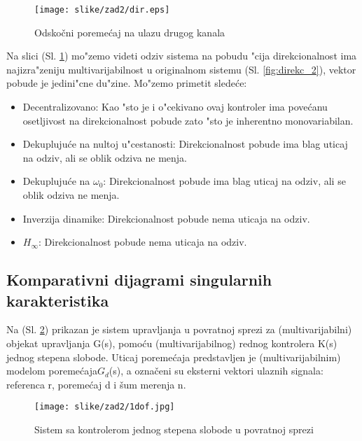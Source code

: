 \documentclass[a4paper,11pt]{article}
\theoremstyle{definition} \newtheorem{deff}{Definicija}[section]
\theoremstyle{definition} \newtheorem{prim}[deff]{Primer}
\theoremstyle{plain} \newtheorem{teor}[deff]{Teorema}
\begin{document}
			\begin{figure}[!ht]
				\centering
				\texttt{[image: slike/zad2/dir.eps]}
				\caption{Odskočni poremećaj na ulazu drugog kanala}
				\label{fig:dir}
			\end{figure}
			\vspace{1cm}
			Na slici (Sl. \ref{fig:dir}) mo"zemo videti odziv sistema na pobudu "cija direkcionalnost ima najizra"zeniju multivarijabilnost u originalnom sistemu (Sl. \ref{fig:direkc_2}), vektor pobude je jedini"cne du"zine. Mo"zemo primetit slede\'ce: 
			\begin{itemize}
				\item Decentralizovano: Kao "sto je i o"cekivano ovaj kontroler ima pove\'canu osetljivost na direkcionalnost pobude zato "sto je inherentno monovariabilan.
				
				\item Dekupluju\'ce na nultoj u"cestanosti: Direkcionalnost pobude ima blag uticaj na odziv, ali se oblik odziva ne menja.
				
				\item Dekupluju\'ce na $\omega_0$: Direkcionalnost pobude ima blag uticaj na odziv, ali se oblik odziva ne menja.
				
				\item Inverzija dinamike: Direkcionalnost pobude nema uticaja na odziv.
				
				\item $H_{\infty}$: Direkcionalnost pobude nema uticaja na odziv.
			\end{itemize}
			
			
			
			\clearpage
			
			
			\subsection{Komparativni dijagrami singularnih karakteristika}
			
			Na (Sl. \ref{fig:1dof}) prikazan je sistem upravljanja u povratnoj sprezi za (multivarijabilni) objekat upravljanja G(s), pomoću (multivarijabilnog) rednog kontrolera K(s) jednog stepena slobode. Uticaj poremećaja predstavljen je
			(multivarijabilnim) modelom poremećaja$G_d$(s), a označeni su eksterni vektori ulaznih signala: referenca r, poremećaj d i šum merenja n.
			\begin{figure}[!h]
				\centering
				\texttt{[image: slike/zad2/1dof.jpg]}
				\caption{Sistem sa kontrolerom jednog stepena slobode u povratnoj sprezi}
				\label{fig:1dof}
			\end{figure}
			
\end{document}
